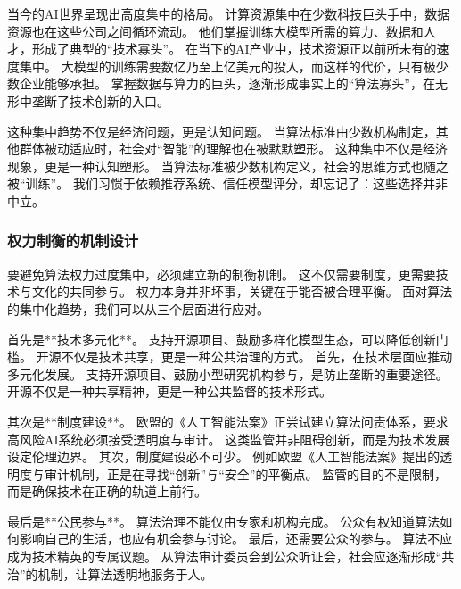 当今的AI世界呈现出高度集中的格局。  
计算资源集中在少数科技巨头手中，数据资源也在这些公司之间循环流动。  
他们掌握训练大模型所需的算力、数据和人才，形成了典型的“技术寡头”。  
在当下的AI产业中，技术资源正以前所未有的速度集中。  
大模型的训练需要数亿乃至上亿美元的投入，而这样的代价，只有极少数企业能够承担。  
掌握数据与算力的巨头，逐渐形成事实上的“算法寡头”，在无形中垄断了技术创新的入口。

这种集中趋势不仅是经济问题，更是认知问题。  
当算法标准由少数机构制定，其他群体被动适应时，社会对“智能”的理解也在被默默塑形。  
这种集中不仅是经济现象，更是一种认知塑形。  
当算法标准被少数机构定义，社会的思维方式也随之被“训练”。  
我们习惯于依赖推荐系统、信任模型评分，却忘记了：这些选择并非中立。

\subsubsection{权力制衡的机制设计}

要避免算法权力过度集中，必须建立新的制衡机制。  
这不仅需要制度，更需要技术与文化的共同参与。  
权力本身并非坏事，关键在于能否被合理平衡。  
面对算法的集中化趋势，我们可以从三个层面进行应对。

首先是**技术多元化**。  
支持开源项目、鼓励多样化模型生态，可以降低创新门槛。  
开源不仅是技术共享，更是一种公共治理的方式。  
首先，在技术层面应推动多元化发展。  
支持开源项目、鼓励小型研究机构参与，是防止垄断的重要途径。  
开源不仅是一种共享精神，更是一种公共监督的技术形式。

其次是**制度建设**。  
欧盟的《人工智能法案》正尝试建立算法问责体系，要求高风险AI系统必须接受透明度与审计。  
这类监管并非阻碍创新，而是为技术发展设定伦理边界。  
其次，制度建设必不可少。  
例如欧盟《人工智能法案》提出的透明度与审计机制，正是在寻找“创新”与“安全”的平衡点。  
监管的目的不是限制，而是确保技术在正确的轨道上前行。

最后是**公民参与**。  
算法治理不能仅由专家和机构完成。  
公众有权知道算法如何影响自己的生活，也应有机会参与讨论。  
最后，还需要公众的参与。  
算法不应成为技术精英的专属议题。  
从算法审计委员会到公众听证会，社会应逐渐形成“共治”的机制，让算法透明地服务于人。

